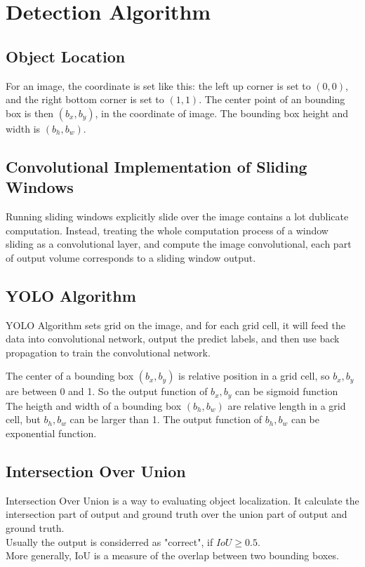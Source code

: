 \documentclass{article}
\begin{document}
\section{Detection Algorithm}
	\subsection{Object Location}
		\begin{flushleft}
			For an image, the coordinate is set like this: the left up corner is set to $(0,0)$, and the right bottom corner is set to $(1,1)$. The center point of an bounding box is then $(b_x,b_y)$, in the coordinate of image. The bounding box height and width is $(b_h,b_w)$.
		\end{flushleft}
	\subsection{Convolutional Implementation of Sliding Windows}
		\begin{flushleft}
			Running sliding windows explicitly slide over the image contains a lot dublicate computation. Instead, treating the whole computation process of a window sliding as a convolutional layer, and compute the image convolutional, each part of output volume corresponds to a sliding window output.
		\end{flushleft}
	\subsection{YOLO Algorithm}
		\begin{flushleft}
			YOLO Algorithm sets grid on the image, and for each grid cell, it will feed the data into convolutional network, output the predict labels, and then use back propagation to train the convolutional network.
		\end{flushleft}
		\begin{flushleft}
			The center of a bounding box $(b_x, b_y)$ is relative position in a grid cell, so $b_x, b_y$ are between 0 and 1. So the output function of $b_x, b_y$ can be sigmoid function\\
			The heigth and width of a bounding box $(b_h, b_w)$ are relative length in a grid cell, but $b_h, b_w$ can be larger than 1. The output function of $b_h, b_w$ can be exponential function.
		\end{flushleft}
	\subsection{Intersection Over Union}
		\begin{flushleft}
			Intersection Over Union is a way to evaluating object localization. It calculate the intersection part of output and ground truth over the union part of output and ground truth.\\ Usually the output is considerred as "correct", if $IoU \geq 0.5$.\\
			More generally, IoU is a measure of the overlap between two bounding boxes.
		\end{flushleft}
\end{document}
